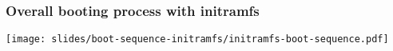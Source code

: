 \begin{frame}
  \frametitle{Overall booting process with initramfs}
  \begin{center}
    \texttt{[image: slides/boot-sequence-initramfs/initramfs-boot-sequence.pdf]}
  \end{center}
\end{frame}
